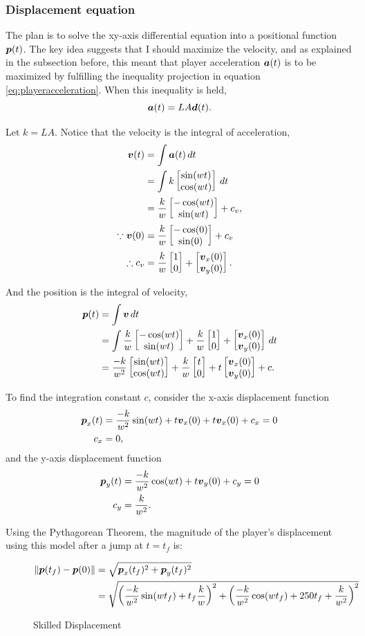 \subsubsection{Displacement equation}
The plan is to solve the xy-axis differential equation into a positional function $\boldsymbol{p}(t)$. The key idea suggests that I should maximize the velocity, and as explained in the subsection before, this meant that player acceleration $\boldsymbol{a}(t)$ is to be maximized by fulfilling the inequality projection in equation \ref{eq:playeracceleration}. When this inequality is held,
\[
    \boldsymbol{a}(t) = LA\boldsymbol{d}(t).
\]

Let $k=LA$. Notice that the velocity is the integral of acceleration,
\begin{align*}
    \boldsymbol{v}(t) &= \int \boldsymbol{a}(t) \, dt\\
    &= \int k \begin{bmatrix}\sin(wt)\\\cos(wt)\end{bmatrix} \, dt\\
    &= \frac{k}{w} \begin{bmatrix}-\cos(wt)\\\sin(wt)\end{bmatrix} + c_v,\\
    \because \boldsymbol{v}(0) &= \frac{k}{w} \begin{bmatrix}-\cos(0)\\\sin(0)\end{bmatrix} + c_v\\
    \therefore c_v &= \frac{k}{w} \begin{bmatrix}1\\0\end{bmatrix} + \begin{bmatrix}\boldsymbol{v}_x(0)\\\boldsymbol{v}_y(0)\end{bmatrix}.
\end{align*}

And the position is the integral of velocity,
\begin{align*}
    \boldsymbol{p}(t) &= \int \boldsymbol{v} \, dt\\
    &= \int \frac{k}{w} \begin{bmatrix}-\cos(wt)\\\sin(wt)\end{bmatrix} + \frac{k}{w}\begin{bmatrix}1\\0\end{bmatrix} + \begin{bmatrix}\boldsymbol{v}_x(0)\\\boldsymbol{v}_y(0)\end{bmatrix} \, dt\\
    &= \frac{-k}{w^2} \begin{bmatrix}\sin(wt)\\\cos(wt)\end{bmatrix} + \frac{k}{w}\begin{bmatrix}t\\0\end{bmatrix}  + t\begin{bmatrix}\boldsymbol{v}_x(0)\\\boldsymbol{v}_y(0)\end{bmatrix} + c.
\end{align*}

To find the integration constant $c$, consider the x-axis displacement function
\begin{align*}
    \boldsymbol{p}_x(t) &= \frac{-k}{w^2} \sin(wt) + t\boldsymbol{v}_x(0) + t\boldsymbol{v}_x(0) + c_x = 0\\
    c_x &= 0,
\end{align*}
and the y-axis displacement function
\begin{align*}
    \boldsymbol{p}_y(t) &= \frac{-k}{w^2} \cos(wt) + t\boldsymbol{v}_y(0) + c_y = 0\\
    c_y &= \frac{k}{w^2}.
\end{align*}

Using the Pythagorean Theorem, the magnitude of the player's displacement using this model after a jump at $t=t_f$ is:
\begin{figure}[H]
    \centering
    \begin{align*}
        \|\boldsymbol{p}(t_f) - \boldsymbol{p}(0)\| &= \sqrt{\boldsymbol{p}_x(t_f)^2 + \boldsymbol{p}_y(t_f)^2}\\
        &= \sqrt{\left(\frac{-k}{w^2}\sin(wt_f) + t_f\frac{k}{w} \right)^2 + \left( \frac{-k}{w^2}\cos(wt_f) + 250t_f + \frac{k}{w^2} \right)^2}
    \end{align*}
    \caption{Skilled Displacement}
    \label{eq:2skilled_displacement}

\end{figure}

